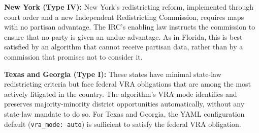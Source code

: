 \textbf{New York (Type IV):} New York's redistricting reform, implemented through court order and a new Independent Redistricting Commission, requires maps with no partisan advantage. The IRC's enabling law instructs the commission to ensure that no party is given an undue advantage. As in Florida, this is best satisfied by an algorithm that cannot receive partisan data, rather than by a commission that promises not to consider it.

\textbf{Texas and Georgia (Type I):} These states have minimal state-law redistricting criteria but face federal VRA obligations that are among the most actively litigated in the country. The algorithm's VRA mode identifies and preserves majority-minority district opportunities automatically, without any state-law mandate to do so. For Texas and Georgia, the YAML configuration default (\texttt{vra\_mode: auto}) is sufficient to satisfy the federal VRA obligation.
